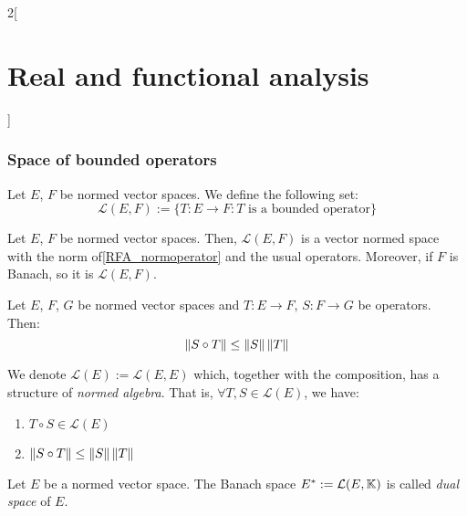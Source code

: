 \documentclass[../../../main_math.tex]{subfiles}
\begin{document}
\begin{multicols}{2}[\section{Real and functional analysis}]
  \subsubsection{Space of bounded operators}
  \begin{definition}
    Let $E$, $F$ be normed vector spaces. We define the following set:
    $$\mathcal{L}(E,F):=\{T:E\rightarrow F: T\text{ is a bounded operator}\}$$
  \end{definition}
  \begin{theorem}
    Let $E$, $F$ be normed vector spaces. Then, $\mathcal{L}(E,F)$ is a vector normed space with the norm of\cref{RFA_normoperator} and the usual operators. Moreover, if $F$ is Banach, so it is $\mathcal{L}(E,F)$.
  \end{theorem}
  \begin{proposition}
    Let $E$, $F$, $G$ be normed vector spaces and $T:E\rightarrow F$, $S:F\rightarrow G$ be operators. Then: $$\left\|S\circ T\right\|\leq\left\|S\right\|\left\|T\right\|$$
  \end{proposition}
  \begin{definition}
    We denote $\mathcal{L}(E):=\mathcal{L}(E,E)$ which, together with the composition, has a structure of \emph{normed algebra}. That is, $\forall T,S\in\mathcal{L}(E)$, we have:
    \begin{enumerate}
      \item $T\circ S\in\mathcal{L}(E)$
      \item $\left\|S\circ T\right\|\leq\left\|S\right\|\left\|T\right\|$
    \end{enumerate}
  \end{definition}
  \begin{definition}
    Let $E$ be a normed vector space. The Banach space $E^*:=\mathcal{L}(E,\mathbb{K})$ is called \emph{dual space} of $E$.
  \end{definition}

\end{multicols}
\end{document}
